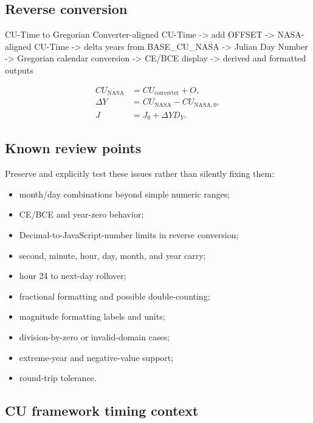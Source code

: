 \documentclass[11pt,letterpaper]{article}
\begin{document}
\subsection{Reverse conversion}

\begin{codebox}{CU-Time to Gregorian}
Converter-aligned CU-Time
  -> add OFFSET
  -> NASA-aligned CU-Time
  -> delta years from BASE_CU_NASA
  -> Julian Day Number
  -> Gregorian calendar conversion
  -> CE/BCE display
  -> derived and formatted outputs
\end{codebox}

\begin{align*}
CU_{\mathrm{NASA}} &= CU_{\mathrm{converter}} + O, \\
\Delta Y &= CU_{\mathrm{NASA}} - CU_{\mathrm{NASA},0}, \\
J &= J_0 + \Delta Y D_Y.
\end{align*}

\subsection{Known review points}

Preserve and explicitly test these issues rather than silently fixing them:

\begin{itemize}
    \item month/day combinations beyond simple numeric ranges;
    \item CE/BCE and year-zero behavior;
    \item Decimal-to-JavaScript-number limits in reverse conversion;
    \item second, minute, hour, day, month, and year carry;
    \item hour 24 to next-day rollover;
    \item fractional formatting and possible double-counting;
    \item magnitude formatting labels and units;
    \item division-by-zero or invalid-domain cases;
    \item extreme-year and negative-value support;
    \item round-trip tolerance.
\end{itemize}

\subsection{CU framework timing context}
\end{document}
